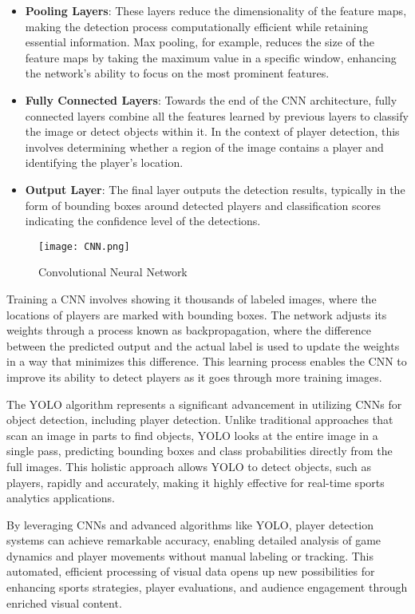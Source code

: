 \documentclass[12pt, letterpaper]{article}
\begin{document}
{\begin{spacing}{1.2}
\begin{itemize}
    \item \textbf{Pooling Layers}: These layers reduce the dimensionality of the feature maps, making the detection process computationally efficient while retaining essential information. Max pooling, for example, reduces the size of the feature maps by taking the maximum value in a specific window, enhancing the network's ability to focus on the most prominent features.

    \item \textbf{Fully Connected Layers}: Towards the end of the CNN architecture, fully connected layers combine all the features learned by previous layers to classify the image or detect objects within it. In the context of player detection, this involves determining whether a region of the image contains a player and identifying the player's location.

    \item \textbf{Output Layer}: The final layer outputs the detection results, typically in the form of bounding boxes around detected players and classification scores indicating the confidence level of the detections.
\end{itemize}

\begin{figure}[htbp]
\centering
\texttt{[image: CNN.png]}
\captionsetup{font=large}
\caption{Convolutional Neural Network}
\label{fig:cnn}
\end{figure}

Training a CNN involves showing it thousands of labeled images, where the locations of players are marked with bounding boxes. The network adjusts its weights through a process known as backpropagation, where the difference between the predicted output and the actual label is used to update the weights in a way that minimizes this difference. This learning process enables the CNN to improve its ability to detect players as it goes through more training images.

The YOLO algorithm represents a significant advancement in utilizing CNNs for object detection, including player detection. Unlike traditional approaches that scan an image in parts to find objects, YOLO looks at the entire image in a single pass, predicting bounding boxes and class probabilities directly from the full images. This holistic approach allows YOLO to detect objects, such as players, rapidly and accurately, making it highly effective for real-time sports analytics applications.

By leveraging CNNs and advanced algorithms like YOLO, player detection systems can achieve remarkable accuracy, enabling detailed analysis of game dynamics and player movements without manual labeling or tracking. This automated, efficient processing of visual data opens up new possibilities for enhancing sports strategies, player evaluations, and audience engagement through enriched visual content.


\end{spacing}}
\end{document}
